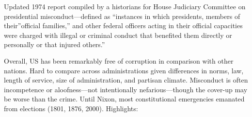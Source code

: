 \documentclass[
]{article}
\begin{document}
Updated 1974 report compiled by a historians for House Judiciary
Committee on presidential misconduct---defined as ``instances in which
presidents, members of their''official families,'' and other federal
officers acting in their official capacities were charged with illegal
or criminal conduct that benefited them directly or personally or that
injured others.''

Overall, US has been remarkably free of corruption in comparison with
other nations. Hard to compare across administrations given differences
in norms, law, length of service, size of administration, and partisan
climate. Misconduct is often incompetence or aloofness---not
intentionally nefarious---though the cover-up may be worse than the
crime. Until Nixon, most constitutional emergencies emanated from
elections (1801, 1876, 2000). Highlights:
\end{document}
